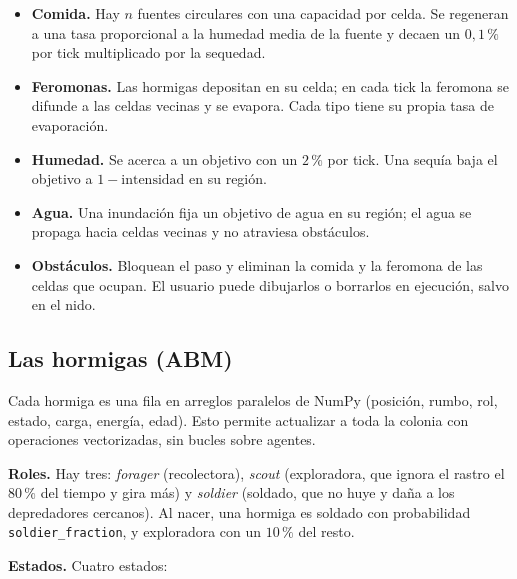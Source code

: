 \documentclass[11pt,a4paper]{article}
\newcommand{\code}[1]{\texttt{\small #1}}
\begin{document}
\begin{itemize}
  \item \textbf{Comida.} Hay $n$ fuentes circulares con una capacidad por celda. Se regeneran a una tasa proporcional a la humedad media de la fuente y decaen un $0{,}1\,\%$ por tick multiplicado por la sequedad.
  \item \textbf{Feromonas.} Las hormigas depositan en su celda; en cada tick la feromona se difunde a las celdas vecinas y se evapora. Cada tipo tiene su propia tasa de evaporación.
  \item \textbf{Humedad.} Se acerca a un objetivo con un $2\,\%$ por tick. Una sequía baja el objetivo a $1-\text{intensidad}$ en su región.
  \item \textbf{Agua.} Una inundación fija un objetivo de agua en su región; el agua se propaga hacia celdas vecinas y no atraviesa obstáculos.
  \item \textbf{Obstáculos.} Bloquean el paso y eliminan la comida y la feromona de las celdas que ocupan. El usuario puede dibujarlos o borrarlos en ejecución, salvo en el nido.
\end{itemize}

\subsection{Las hormigas (ABM)}

Cada hormiga es una fila en arreglos paralelos de NumPy (posición, rumbo, rol, estado, carga, energía, edad). Esto permite actualizar a toda la colonia con operaciones vectorizadas, sin bucles sobre agentes.

\textbf{Roles.} Hay tres: \textit{forager} (recolectora), \textit{scout} (exploradora, que ignora el rastro el $80\,\%$ del tiempo y gira más) y \textit{soldier} (soldado, que no huye y daña a los depredadores cercanos). Al nacer, una hormiga es soldado con probabilidad \code{soldier\_fraction}, y exploradora con un $10\,\%$ del resto.

\textbf{Estados.} Cuatro estados:
\end{document}
